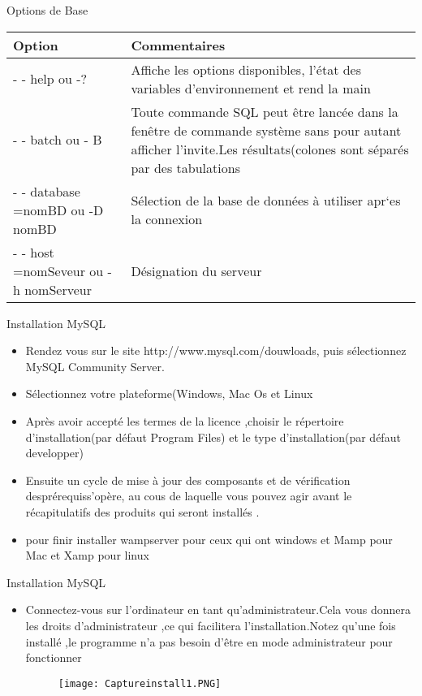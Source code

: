 \documentclass{beamer}
\begin{document}
 \begin{frame}{Options de Base}
 \begin{center}
\begin{tabular}{|p{5cm}||p{5cm}|}
\hline Option  &  Commentaires \\
\hline - - help ou -?  &  Affiche les options disponibles, l'\'etat des variables d'environnement et rend la main   \\
\cline{1-2}  - - batch ou - B  & Toute commande SQL peut \^etre lanc\'ee dans la fen\^etre de commande syst\`eme sans pour autant afficher l'invite.Les r\'esultats(colones sont s\'epar\'es par des tabulations  \\
\hline - - database =nomBD ou -D nomBD  &  S\'election de la base de donn\'ees \`a utiliser apr`es la connexion\\
\cline{1-2} - - host =nomSeveur ou -h nomServeur  & Désignation du serveur  \\
\hline
\end{tabular}
\end{center}
    
 \end{frame}
 \begin{frame}{Installation MySQL}
 \begin{itemize}
     \item Rendez vous sur le site http://www.mysql.com/douwloads, puis sélectionnez MySQL Community Server.
     \item Sélectionnez votre plateforme(Windows, Mac Os et Linux
     \item Apr\`es avoir accept\'e les termes de la licence ,choisir le r\'epertoire d'installation(par défaut Program Files\MySQL) et le type d'installation(par d\'efaut developper)
     \item Ensuite un cycle de mise à jour des composants et de v\'erification despr\'erequiss'op\`ere, au cous de laquelle vous pouvez agir avant le r\'ecapitulatifs des produits qui seront install\'es .
     \item pour finir installer wampserver pour ceux qui ont windows et Mamp pour Mac et Xamp pour linux
     \end{itemize}
     
 \end{frame}
 \begin{frame}{Installation MySQL}
 \begin{itemize}
     \item Connectez-vous sur l'ordinateur en tant qu'administrateur.Cela vous donnera les droits d'administrateur ,ce qui facilitera l'installation.Notez qu'une fois installé ,le programme n'a pas besoin d'être en mode administrateur pour fonctionner
      \begin{figure}[h]
\centering	
 \texttt{[image: Captureinstall1.PNG]}
\end{figure}
\end{itemize}
\end{frame}
\end{document}
